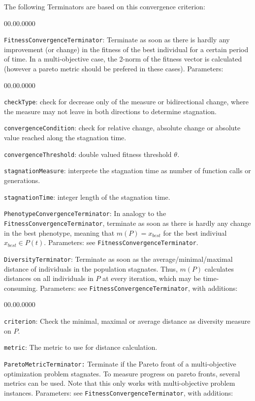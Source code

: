 The following Terminators are based on this convergence criterion:
\begin{lyxlist}{00.00.0000}
\item [{\texttt{FitnessConvergenceTerminator}:}] Terminate as soon as there
is hardly any improvement (or change) in the fitness of the best individual
for a certain period of time. In a multi-objective case, the 2-norm
of the fitness vector is calculated (however a pareto metric should
be prefered in these cases). Parameters: 

\begin{lyxlist}{00.00.0000}
\item [{\texttt{checkType}:}] check for decrease only of the measure or
bidirectional change, where the measure may not leave in both directions
to determine stagnation.
\item [{\texttt{convergenceCondition}:}] check for relative change, absolute
change or absolute value reached along the stagnation time.
\item [{\texttt{convergenceThreshold}:}] double valued fitness threshold
\emph{$\theta$.}
\item [{\texttt{stagnationMeasure}:}] interprete the stagnation time as
number of function calls or generations.
\item [{\texttt{stagnationTime}:}] integer length of the stagnation time.
\end{lyxlist}
\item [{\texttt{PhenotypeConvergenceTerminator}:}] In analogy to the \texttt{FitnessConvergenceTerminator},
terminate as soon as there is hardly any change in the best phenotype,
meaning that $m(P)=x_{best}$ for the best indiviual $x_{best}\in P(t)$.
Parameters: see \texttt{FitnessConvergenceTerminator}.
\item [{\texttt{DiversityTerminator}:}] Terminate as soon as the average/minimal/maximal
distance of individuals in the population stagnates. Thus, $m(P)$
calculates distances on all individuals in $P$ at every iteration,
which may be time-consuming. Parameters: see \texttt{FitnessConvergenceTerminator},
with additions:

\begin{lyxlist}{00.00.0000}
\item [{\texttt{criterion}:}] Check the minimal, maximal or average distance
as diversity measure on $P$.
\item [{\texttt{metric}:}] The metric to use for distance calculation.
\end{lyxlist}
\item [{\texttt{ParetoMetricTerminator:}}] Terminate if the Pareto front
of a multi-objective optimization problem stagnates. To measure progress
on pareto fronts, several metrics can be used. Note that this only
works with multi-objective problem instances. Parameters: see \texttt{FitnessConvergenceTerminator},
with additions:


\end{lyxlist}
